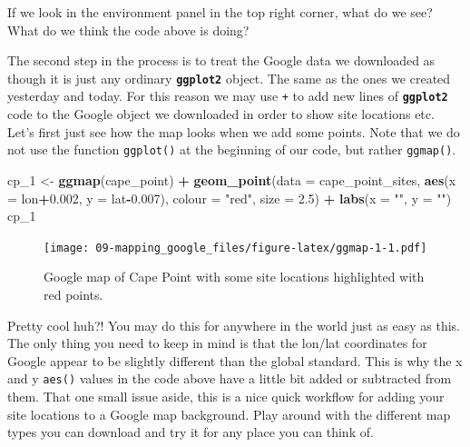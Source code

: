 \documentclass[]{book}
\newenvironment{Shaded}{\begin{snugshade}}{\end{snugshade}}
\newcommand{\KeywordTok}[1]{\textcolor[rgb]{0.13,0.29,0.53}{\textbf{#1}}}
\newcommand{\DataTypeTok}[1]{\textcolor[rgb]{0.13,0.29,0.53}{#1}}
\newcommand{\DecValTok}[1]{\textcolor[rgb]{0.00,0.00,0.81}{#1}}
\newcommand{\FloatTok}[1]{\textcolor[rgb]{0.00,0.00,0.81}{#1}}
\newcommand{\StringTok}[1]{\textcolor[rgb]{0.31,0.60,0.02}{#1}}
\newcommand{\OperatorTok}[1]{\textcolor[rgb]{0.81,0.36,0.00}{\textbf{#1}}}
\newcommand{\NormalTok}[1]{#1}
\theoremstyle{definition}
\theoremstyle{definition}
\theoremstyle{definition}
\theoremstyle{remark}
\begin{document}
If we look in the environment panel in the top right corner, what do we
see? What do we think the code above is doing?

The second step in the process is to treat the Google data we downloaded
as though it is just any ordinary \textbf{\texttt{ggplot2}} object. The
same as the ones we created yesterday and today. For this reason we may
use \texttt{+} to add new lines of \textbf{\texttt{ggplot2}} code to the
Google object we downloaded in order to show site locations etc. Let's
first just see how the map looks when we add some points. Note that we
do not use the function \texttt{ggplot()} at the beginning of our code,
but rather \texttt{ggmap()}.

\begin{Shaded}
\begin{Highlighting}[]
\NormalTok{cp_}\DecValTok{1}\NormalTok{ <-}\StringTok{ }\KeywordTok{ggmap}\NormalTok{(cape_point) }\OperatorTok{+}
\StringTok{  }\KeywordTok{geom_point}\NormalTok{(}\DataTypeTok{data =}\NormalTok{ cape_point_sites, }\KeywordTok{aes}\NormalTok{(}\DataTypeTok{x =}\NormalTok{ lon}\OperatorTok{+}\FloatTok{0.002}\NormalTok{, }\DataTypeTok{y =}\NormalTok{ lat}\OperatorTok{-}\FloatTok{0.007}\NormalTok{), }
             \DataTypeTok{colour =} \StringTok{"red"}\NormalTok{, }\DataTypeTok{size =}  \FloatTok{2.5}\NormalTok{) }\OperatorTok{+}
\StringTok{  }\KeywordTok{labs}\NormalTok{(}\DataTypeTok{x =} \StringTok{""}\NormalTok{, }\DataTypeTok{y =} \StringTok{""}\NormalTok{)}
\NormalTok{cp_}\DecValTok{1}
\end{Highlighting}
\end{Shaded}

\begin{figure}
\centering
\texttt{[image: 09-mapping\_google\_files/figure-latex/ggmap-1-1.pdf]}
\caption{\label{fig:ggmap-1}Google map of Cape Point with some site
locations highlighted with red points.}
\end{figure}

Pretty cool huh?! You may do this for anywhere in the world just as easy
as this. The only thing you need to keep in mind is that the lon/lat
coordinates for Google appear to be slightly different than the global
standard. This is why the x and y \texttt{aes()} values in the code
above have a little bit added or subtracted from them. That one small
issue aside, this is a nice quick workflow for adding your site
locations to a Google map background. Play around with the different map
types you can download and try it for any place you can think of.
\end{document}
